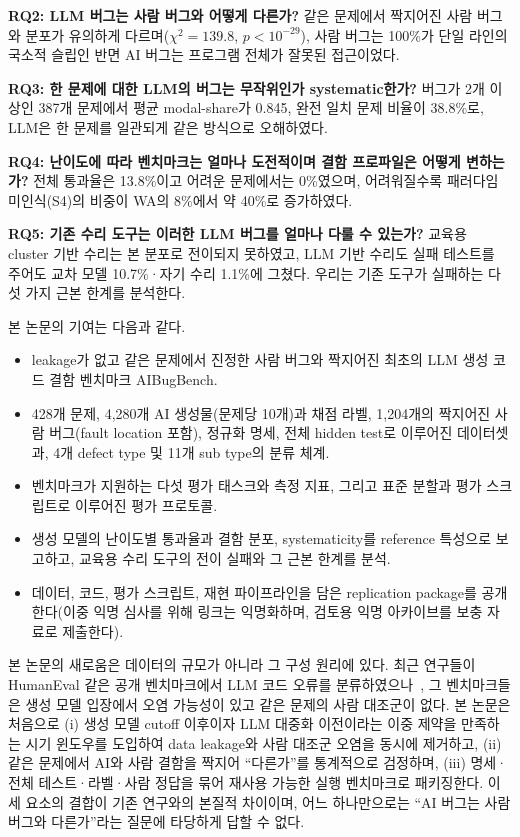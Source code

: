 \documentclass[10pt,conference]{IEEEtran}
\begin{document}
\noindent\textbf{RQ2: LLM 버그는 사람 버그와 어떻게 다른가?} 같은 문제에서 짝지어진 사람 버그와 분포가 유의하게 다르며($\chi^2=139.8$, $p<10^{-29}$), 사람 버그는 100\%가 단일 라인의 국소적 슬립인 반면 AI 버그는 프로그램 전체가 잘못된 접근이었다.

\noindent\textbf{RQ3: 한 문제에 대한 LLM의 버그는 무작위인가 systematic한가?} 버그가 2개 이상인 387개 문제에서 평균 modal-share가 0.845, 완전 일치 문제 비율이 38.8\%로, LLM은 한 문제를 일관되게 같은 방식으로 오해하였다.

\noindent\textbf{RQ4: 난이도에 따라 벤치마크는 얼마나 도전적이며 결함 프로파일은 어떻게 변하는가?} 전체 통과율은 13.8\%이고 어려운 문제에서는 0\%였으며, 어려워질수록 패러다임 미인식(S4)의 비중이 WA의 8\%에서 약 40\%로 증가하였다.

\noindent\textbf{RQ5: 기존 수리 도구는 이러한 LLM 버그를 얼마나 다룰 수 있는가?} 교육용 cluster 기반 수리는 본 분포로 전이되지 못하였고, LLM 기반 수리도 실패 테스트를 주어도 교차 모델 10.7\%·자기 수리 1.1\%에 그쳤다. 우리는 기존 도구가 실패하는 다섯 가지 근본 한계를 분석한다.

본 논문의 기여는 다음과 같다.
\begin{itemize}
\item leakage가 없고 같은 문제에서 진정한 사람 버그와 짝지어진 최초의 LLM 생성 코드 결함 벤치마크 AIBugBench.
\item 428개 문제, 4{,}280개 AI 생성물(문제당 10개)과 채점 라벨, 1{,}204개의 짝지어진 사람 버그(fault location 포함), 정규화 명세, 전체 hidden test로 이루어진 데이터셋과, 4개 defect type 및 11개 sub type의 분류 체계.
\item 벤치마크가 지원하는 다섯 평가 태스크와 측정 지표, 그리고 표준 분할과 평가 스크립트로 이루어진 평가 프로토콜.
\item 생성 모델의 난이도별 통과율과 결함 분포, systematicity를 reference 특성으로 보고하고, 교육용 수리 도구의 전이 실패와 그 근본 한계를 분석.
\item 데이터, 코드, 평가 스크립트, 재현 파이프라인을 담은 replication package를 공개한다(이중 익명 심사를 위해 링크는 익명화하며, 검토용 익명 아카이브를 보충 자료로 제출한다).
\end{itemize}

본 논문의 새로움은 데이터의 규모가 아니라 그 구성 원리에 있다. 최근 연구들이 HumanEval 같은 공개 벤치마크에서 LLM 코드 오류를 분류하였으나~\cite{wang2025characteristics,tambon2025bugs,dou2026wrong}, 그 벤치마크들은 생성 모델 입장에서 오염 가능성이 있고 같은 문제의 사람 대조군이 없다. 본 논문은 처음으로 (i) 생성 모델 cutoff 이후이자 LLM 대중화 이전이라는 이중 제약을 만족하는 시기 윈도우를 도입하여 data leakage와 사람 대조군 오염을 동시에 제거하고, (ii) 같은 문제에서 AI와 사람 결함을 짝지어 ``다른가''를 통계적으로 검정하며, (iii) 명세·전체 테스트·라벨·사람 정답을 묶어 재사용 가능한 실행 벤치마크로 패키징한다. 이 세 요소의 결합이 기존 연구와의 본질적 차이이며, 어느 하나만으로는 ``AI 버그는 사람 버그와 다른가''라는 질문에 타당하게 답할 수 없다.
\end{document}
